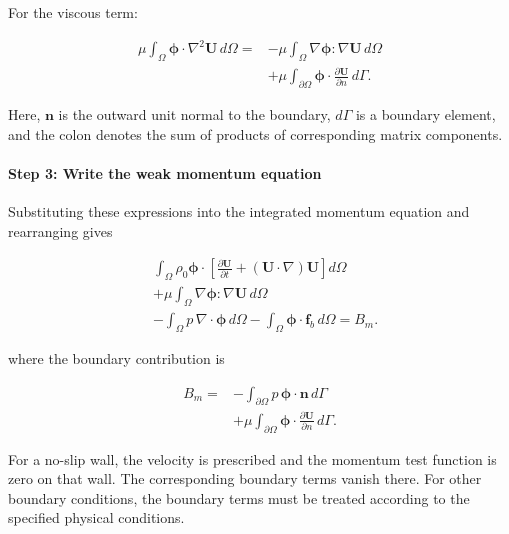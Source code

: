 \documentclass{article}
\begin{document}
For the viscous term:

\begin{equation}
\begin{aligned}
\mu\int_\Omega\boldsymbol{\phi}\cdot
\nabla^2\mathbf{U}\,d\Omega
={}&-\mu\int_\Omega
\nabla\boldsymbol{\phi}:\nabla\mathbf{U}\,d\Omega\\
&+\mu\int_{\partial\Omega}
\boldsymbol{\phi}\cdot
\frac{\partial\mathbf{U}}{\partial n}\,d\Gamma.
\end{aligned}
\end{equation}

Here, $\mathbf{n}$ is the outward unit normal to the
boundary, $d\Gamma$ is a boundary element, and the colon
denotes the sum of products of corresponding matrix
components.

\paragraph{Step 3: Write the weak momentum equation}

Substituting these expressions into the integrated
momentum equation and rearranging gives

\begin{equation}
\boxed{
\begin{aligned}
&\int_\Omega \rho_0\boldsymbol{\phi}\cdot
\left[
\frac{\partial\mathbf{U}}{\partial t}
+(\mathbf{U}\cdot\nabla)\mathbf{U}
\right]d\Omega\\
&+\mu\int_\Omega
\nabla\boldsymbol{\phi}:\nabla\mathbf{U}\,d\Omega\\
&-\int_\Omega p\,\nabla\cdot\boldsymbol{\phi}\,d\Omega
-\int_\Omega\boldsymbol{\phi}\cdot
\mathbf{f}_b\,d\Omega=B_m.
\end{aligned}
}
\end{equation}

where the boundary contribution is

\begin{equation}
\begin{aligned}
B_m={}&-\int_{\partial\Omega}p\,
\boldsymbol{\phi}\cdot\mathbf{n}\,d\Gamma\\
&+\mu\int_{\partial\Omega}
\boldsymbol{\phi}\cdot
\frac{\partial\mathbf{U}}{\partial n}\,d\Gamma.
\end{aligned}
\end{equation}

For a no-slip wall, the velocity is prescribed and the
momentum test function is zero on that wall. The
corresponding boundary terms vanish there. For other
boundary conditions, the boundary terms must be treated
according to the specified physical conditions.
\end{document}
